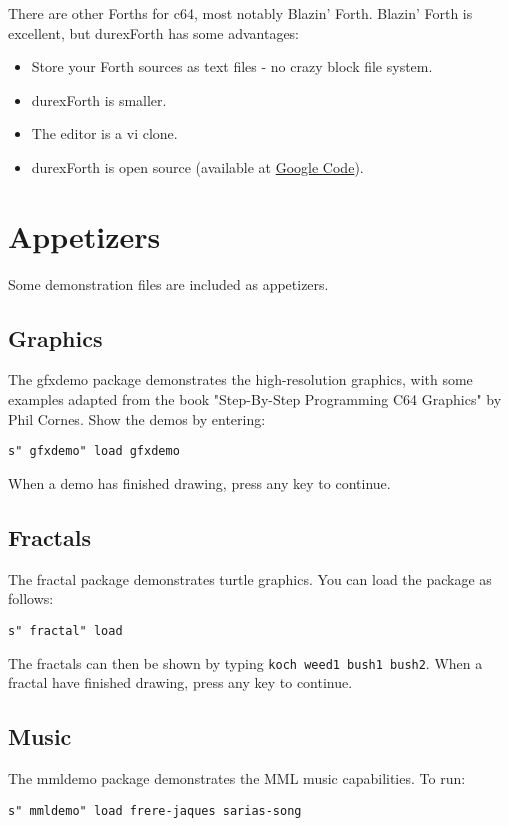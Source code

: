There are other Forths for c64, most notably Blazin' Forth. Blazin' Forth is excellent, but durexForth has some advantages:

\begin{itemize}
\item Store your Forth sources as text files - no crazy block file system.
\item durexForth is smaller.
\item The editor is a vi clone.
\item durexForth is open source (available at \href{http://code.google.com/p/durexforth/}{Google Code}).
\end{itemize}

\section{Appetizers}

Some demonstration files are included as appetizers.

\subsection{Graphics}

The gfxdemo package demonstrates the high-resolution graphics, with some examples adapted from the book "Step-By-Step Programming C64 Graphics" by Phil Cornes. 
Show the demos by entering:

\texttt{s" gfxdemo" load gfxdemo}

When a demo has finished drawing, press any key to continue.

\subsection{Fractals}

The fractal package demonstrates turtle graphics. You can load the package as follows:

\texttt{s" fractal" load}

The fractals can then be shown by typing \texttt{koch weed1 bush1 bush2}. When a fractal have finished drawing, press any key to continue.

\subsection{Music}

The mmldemo package demonstrates the MML music capabilities. To run:

\texttt{s" mmldemo" load frere-jaques sarias-song}
